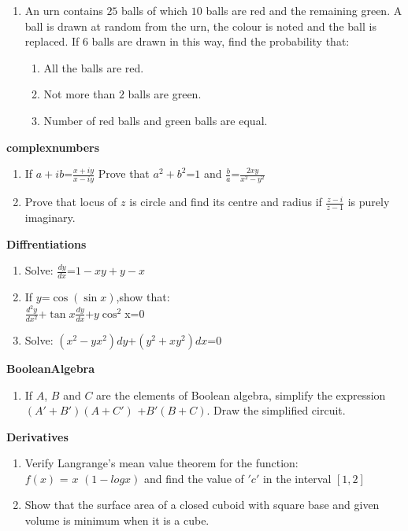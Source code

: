 \documentclass[12pt,-letter paper]{article}
\providecommand{\sbrak}[1]{\ensuremath{{}\left[#1\right]}}
\providecommand{\brak}[1]{\ensuremath{\left(#1\right)}}
\begin{document}
\begin{enumerate}
	 \item An urn contains $25$ balls of which $10$ balls are red and the remaining green. A ball is drawn at random from the urn, the colour is noted and the ball is replaced. If $6$ balls are drawn in this way, find the probability that: 
		 \begin{enumerate}
		\item All the balls are red. 
		\item Not more than $2$ balls are green. 
		\item Number of red balls and green balls are equal.
		 \end{enumerate}

\end{enumerate}
\begin{center}
	\textbf{complexnumbers}
\end{center}
\begin{enumerate}
	\item If $a+ib$=$\frac{x+iy}{x-iy}$ Prove that $a^2+b^2$=$1$ and $\frac{b}{a}$=$\frac{2xy}{x^2-y^2}$
	\item Prove that locus of $z$ is circle and find its centre and radius if $\frac{z-i}{z-1}$ is purely imaginary. 
\end{enumerate}
\begin{center}
	\textbf{Diffrentiations}
\end{center}
\begin{enumerate}
	\item Solve: $\frac{dy}{dx}$=$1-xy+y-x$
	\item If $y$=$\cos$\brak{\sin{x}},show that: \\
		$\frac{d^2y}{dx^2}$+$\tan{x}$$\frac{dy}{dx}$+$y$$\cos^2${x}=$0$
	\item Solve:  $\brak{x^2-yx^2}$$dy$+$\brak{y^2+xy^2}$$dx$=$0$
\end{enumerate}
\begin{center}
	\textbf{BooleanAlgebra}
\end{center}
\begin{enumerate}
	\item  If $A$, $B$ and $C$ are the elements of Boolean algebra, simplify the expression $\brak{A'+B'}$$\brak{A + C'}$ +$ B'$$\brak{B + C}$. Draw the simplified circuit.
\end{enumerate}
\begin{center}
	\textbf{Derivatives}
\end{center}
	\begin{enumerate}
		\item Verify Langrange's mean value theorem for the function: \\ 
$f$\brak{x} = $x$ $\brak{1 - log x}$ and find the value of $'c'$ in the interval \sbrak{1,2} 
\item Show that the surface area of a closed cuboid with square base and given volume is minimum when it is a cube.
	\end{enumerate}
\end{document}
